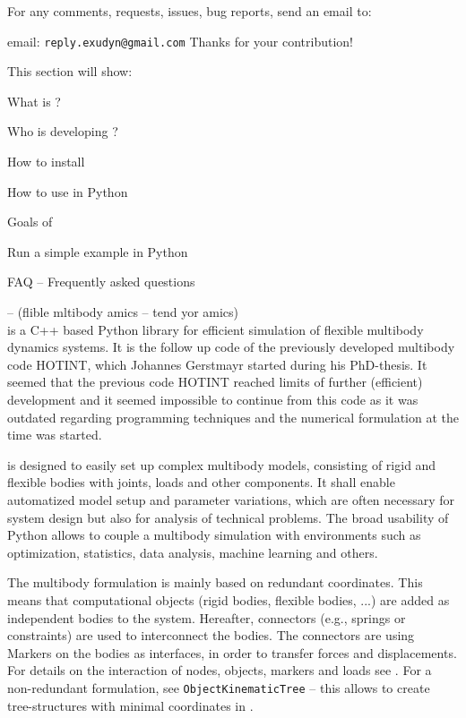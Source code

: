 For any comments, requests, issues, bug reports, send an email to: 
\bi
  \item email: \texttt{reply.exudyn@gmail.com}
\ei
Thanks for your contribution!

This section will show:
\bn
  \item What is \codeName ?
  \item Who is developing \codeName ?
  \item How to install \codeName 
  \item How to use \codeName in Python
  \item Goals of \codeName
  \item Run a simple example in Python
  \item FAQ -- Frequently asked questions
\en

\codeName -- (flible mltibody amics  -- tend yor amics) \vspace{6pt}\\
\noindent \codeName is a C++ based Python library for efficient simulation of flexible multibody dynamics systems.
It is the follow up code of the previously developed multibody code HOTINT, which Johannes Gerstmayr started during his PhD-thesis.
It seemed that the previous code HOTINT reached limits of further (efficient) development and it seemed impossible to continue from this code as it was outdated regarding programming techniques and the numerical formulation at the time \codeName was started.

\codeName is designed to easily set up complex multibody models, consisting of rigid and flexible bodies with joints, loads and other components. It shall enable automatized model setup and parameter variations, which are often necessary for system design but also for analysis of technical problems. The broad usability of Python allows to couple a multibody simulation with environments such as optimization, statistics, data analysis, machine learning and others.

The multibody formulation is mainly based on redundant coordinates. This means that computational objects (rigid bodies, flexible bodies, ...) are added as independent bodies to the system. Hereafter, connectors (e.g., springs or constraints) are used to interconnect the bodies. The connectors are using Markers on the bodies as interfaces, in order to transfer forces and displacements.
For details on the interaction of nodes, objects, markers and loads see . For a non-redundant formulation, see \texttt{ObjectKinematicTree} -- this allows to create tree-structures with minimal coordinates in \codeName.

